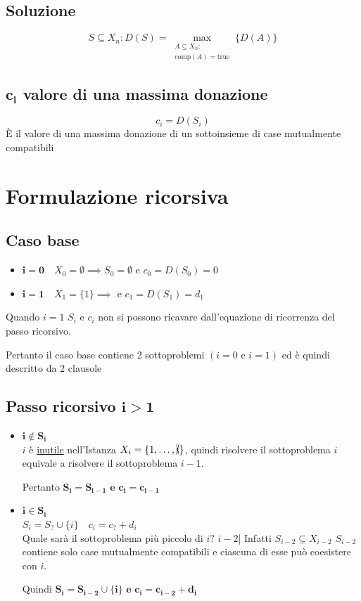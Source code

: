 \subsection{Soluzione}
{
    \large
    $$
        S \subseteq X_n : D(S) = \max_{\substack{A \subseteq X_n : \\ \text{comp}(A) = \text{true}}} \{ D(A) \}
    $$
}

\subsection{$\mathbf{c_i}$ valore di una massima donazione}
{
    \large
    $$
        c_i = D(S_i)
    $$
}
È il valore di una massima donazione di un sottoinsieme di case mutualmente compatibili

\section{Formulazione ricorsiva}
\subsection{Caso base}
{
    \large
    \begin{itemize}
        \item $\mathbf{i = 0} \quad X_0 = \emptyset \implies S_0 = \emptyset \text{ e }c_0=D(S_0)=0$
        \item $\mathbf{i=1} \quad X_1 = \{1\} \implies \text{ e } c_1=D(S_1) = d_1$
    \end{itemize}
}

Quando $i=1$ $S_i$ e $c_i$ non si possono ricavare dall'equazione di ricorrenza del passo ricorsivo.

Pertanto il caso base contiene 2 sottoproblemi $(i=0 \text{ e } i=1)$ ed è quindi descritto da 2 clausole

\subsection{Passo ricorsivo $\mathbf{i > 1}$}
\begin{itemize}
    \item $\mathbf{i \not \in S_i}$ \\
    $i$ è \uline{inutile} nell'Istanza $X_i = \{1, \dots, \xcancel{i}\}$, quindi risolvere il sottoproblema $i$ equivale a risolvere il sottoproblema $i-1$.

    Pertanto $\mathbf{S_i=S_{i-1} \text{ e } c_i = c_{i-1}}$

    \item $\mathbf{i \in S_i}$\\
    $S_i = S_{?} \cup \{i\} \quad c_i = c_{?} + d_i$\\
    Quale sarà il sottoproblema più piccolo di $i?$ $i-2$| Infatti $S_{i-2} \subseteq X_{i-2}$ $S_{i-2}$ contiene solo case mutualmente compatibili e ciascuna di esse può coesistere con $i$.

    Quindi $\mathbf{S_i = S_{i-2} \cup \{i\} \text{ e } c_i = c_{i-2} + d_i}$
\end{itemize}

